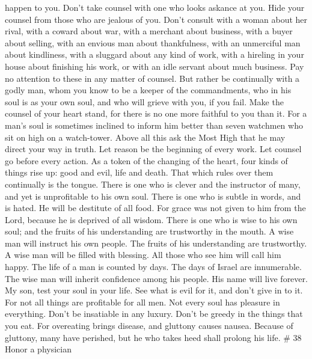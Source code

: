 happen to you.  Don't take counsel with one who looks
askance at you. Hide your counsel from those who are jealous of you.
 Don't consult with a woman about her rival, with a coward
about war, with a merchant about business, with a buyer about selling,
with an envious man about thankfulness, with an unmerciful man about
kindliness, with a sluggard about any kind of work, with a hireling in
your house about finishing his work, or with an idle servant about much
business. Pay no attention to these in any matter of counsel.
 But rather be continually with a godly man, whom you know
to be a keeper of the commandments, who in his soul is as your own soul,
and who will grieve with you, if you fail.  Make the
counsel of your heart stand, for there is no one more faithful to you
than it.  For a man's soul is sometimes inclined to inform
him better than seven watchmen who sit on high on a watch-tower.
 Above all this ask the Most High that he may direct your
way in truth.  Let reason be the beginning of every work.
Let counsel go before every action.  As a token of the
changing of the heart,  four kinds of things rise up: good
and evil, life and death. That which rules over them continually is the
tongue.  There is one who is clever and the instructor of
many, and yet is unprofitable to his own soul.  There is
one who is subtle in words, and is hated. He will be destitute of all
food.  For grace was not given to him from the Lord,
because he is deprived of all wisdom.  There is one who is
wise to his own soul; and the fruits of his understanding are
trustworthy in the mouth.  A wise man will instruct his own
people. The fruits of his understanding are trustworthy.  A
wise man will be filled with blessing. All those who see him will call
him happy.  The life of a man is counted by days. The days
of Israel are innumerable.  The wise man will inherit
confidence among his people. His name will live forever. 
My son, test your soul in your life. See what is evil for it, and don't
give in to it.  For not all things are profitable for all
men. Not every soul has pleasure in everything.  Don't be
insatiable in any luxury. Don't be greedy in the things that you eat.
 For overeating brings disease, and gluttony causes nausea.
 Because of gluttony, many have perished, but he who takes
heed shall prolong his life. \# 38  Honor a physician
